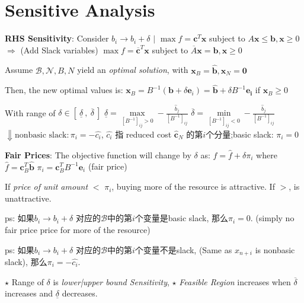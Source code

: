 \documentclass[9pt]{article}
\begin{document}
\section{Sensitive Analysis} %

\textbf{RHS Sensitivity}: {\small Consider $b_i\to b_i+\delta$ \quad $\big|$ \quad $\max f=\mathbf{c}^T\mathbf{x}$ subject to $A\mathbf{x}\leq \mathbf{b},\mathbf{x}\geq0$ \quad $\Rightarrow$ {\tiny (Add Slack variables)} \quad $\max f=\overline{\mathbf{c}}^T\mathbf{x}$ subject to $\overline{A}\mathbf{x}=\mathbf{b},\mathbf{x}\geq0$}

\qquad Assume $\mathcal{B},\mathcal{N},B,N$ yield an \textit{optimal solution}, with $\mathbf{x}_B=\widehat{\mathbf{b}},\mathbf{x}_N=\mathbf{0}$

\qquad Then, the new optimal values is: \quad $\mathbf{x}_B=B^{-1}(\mathbf{b}+\delta \mathbf{e}_i)=\widehat{\mathbf{b}}+\delta B^{-1}\mathbf{e_i}$ \quad if $\mathbf{x}_B\geq0$

\qquad With range of $\delta\in[ \ \underline{\delta} \ , \ \overline{\delta} \ ]$ \quad $\underline{\delta}=\max\limits_{[B^{-1}]_{ij}>0}-\frac{\widehat{b}_j}{[B^{-1}]_{ij}}$ \quad $\overline{\delta}=\min\limits_{[B^{-1}]_{ij}<0}-\frac{\widehat{b}_j}{[B^{-1}]_{ij}}$ \hspace{30pt} {\tiny $\Downarrow \text{nonbasic slack}:\pi_i=-\widehat{c_i}$, $\widehat{c_i}$ 指 reduced cost $\widehat{\mathbf{c}}_N$ 的第$i$个分量;basic slack: $\pi_i=0$}

\qquad \textbf{Fair Prices}: The objective function will change by $\delta$ as: $f=\widehat{f}+\delta\pi_i$ \quad where $\widehat{f}=\mathbf{c}_B^T\widehat{\mathbf{b}}$ \quad $\pi_i=\mathbf{c}_B^TB^{-1}\mathbf{e}_i$ (fair price)

\qquad If \textit{price of unit amount} $<$ $\pi_i$, buying more of the resource is attractive. \qquad If $>$, is unattractive.

\qquad ps: 如果$b_i\to b_i+\delta$ 对应的$\mathcal{B}$中的第$i$个变量是basic slack, 那么$\pi_i=0$. (simply no fair price price for more of the resource)

\qquad ps: 如果$b_i\to b_i+\delta$ 对应的$\mathcal{B}$中的第$i$个变量不是slack, {\tiny (Same as $x_{n+i}$ is nonbasic slack)}, 那么$\pi_i=-\widehat{c_i}$.

\qquad $\star$ Range of $\delta$ is \textit{lower|upper bound Sensitivity}, \quad $\star$ \textit{Feasible Region} increases when $\overline{\delta}$ increases and $\underline{\delta}$ decreases.
\end{document}
